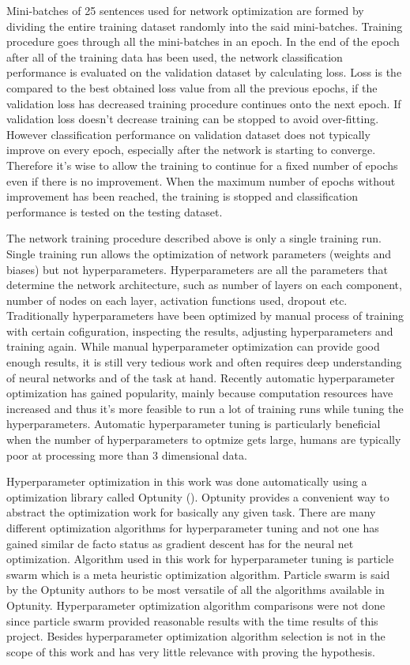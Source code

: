 \documentclass[12pt,a4paper,english
]{tutthesis}
\begin{document}
Mini-batches of 25 sentences used for network optimization are formed by dividing the entire training dataset randomly into the said mini-batches. Training procedure goes through all the mini-batches in an epoch. In the end of the epoch after all of the training data has been used, the network classification performance is evaluated on the validation dataset by calculating loss. Loss is the compared to the best obtained loss value from all the previous epochs, if the validation loss has decreased training procedure continues onto the next epoch. If validation loss doesn't decrease training can be stopped to avoid over-fitting. However classification performance on validation dataset does not typically improve on every epoch, especially after the network is starting to converge. Therefore it's wise to allow the training to continue for a fixed number of epochs even if there is no improvement. When the maximum number of epochs without improvement has been reached, the training is stopped and classification performance is tested on the testing dataset.

The network training procedure described above is only a single training run. Single training run allows the optimization of network parameters (weights and biases) but not hyperparameters. Hyperparameters are all the parameters that determine the network architecture, such as number of layers on each component, number of nodes on each layer, activation functions used, dropout etc. Traditionally hyperparameters have been optimized by manual process of training with certain cofiguration, inspecting the results, adjusting hyperparameters and training again. While manual hyperparameter optimization can provide good enough results, it is still very tedious work and often requires deep understanding of neural networks and of the task at hand. Recently automatic hyperparameter optimization has gained popularity, mainly because computation resources have increased and thus it's more feasible to run a lot of training runs while tuning the hyperparameters. Automatic hyperparameter tuning is particularly beneficial when the number of hyperparameters to optmize gets large, humans are typically poor at processing more than 3 dimensional data.

Hyperparameter optimization in this work was done automatically using a optimization library called Optunity (\cite{optunity}). Optunity provides a convenient way to abstract the optimization work for basically any given task. There are many different optimization algorithms for hyperparameter tuning and not one has gained similar de facto status as gradient descent has for the neural net optimization. Algorithm used in this work for hyperparameter tuning is particle swarm which is a meta heuristic optimization algorithm. Particle swarm is said by the Optunity authors to be most versatile of all the algorithms available in Optunity. Hyperparameter optimization algorithm comparisons were not done since particle swarm provided reasonable results with the time results of this project. Besides hyperparameter optimization algorithm selection is not in the scope of this work and has very little relevance with proving the hypothesis.
\end{document}
